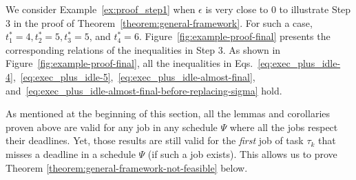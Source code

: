 \begin{example}
  We consider Example~\ref{ex:proof_step1} when $\epsilon$ is very
  close to $0$ to illustrate Step 3 in the proof of
  Theorem~\ref{theorem:general-framework}. For such a case, $t_1^*=4,
  t_2^*=5, t_3^*=5$, and $t_4^*=6$.
  Figure~\ref{fig:example-proof-final} presents the corresponding
  relations of the inequalities in Step 3. 
As shown in Figure~\ref{fig:example-proof-final}, all the inequalities 
  in Eqs.~\eqref{eq:exec_plus_idle-4},~\eqref{eq:exec_plus_idle-5},~\eqref{eq:exec_plus_idle-almost-final}, and~\eqref{eq:exec_plus_idle-almost-final-before-replacing-sigma} hold.
\myendproof
\end{example}

As mentioned at the beginning of this section, all the lemmas and corollaries proven above are valid for any job in any schedule $\Psi$ where all the jobs respect their deadlines. Yet, those results are still valid for the \emph{first} job of task $\tau_k$ that misses a deadline in a schedule $\Psi$ (if such a job exists). This allows us to prove Theorem \ref{theorem:general-framework-not-feasible} below.

